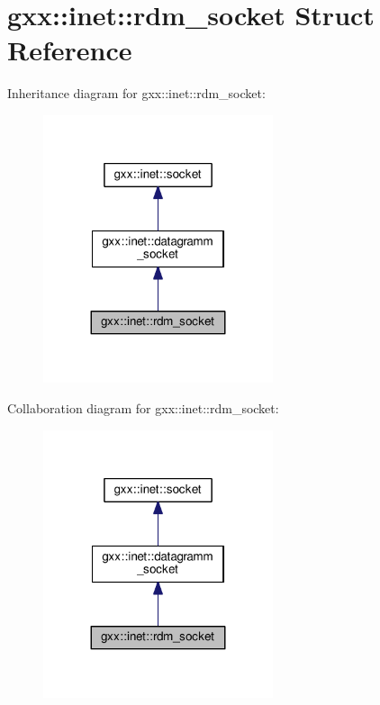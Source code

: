 \hypertarget{structgxx_1_1inet_1_1rdm__socket}{}\section{gxx\+:\+:inet\+:\+:rdm\+\_\+socket Struct Reference}
\label{structgxx_1_1inet_1_1rdm__socket}


Inheritance diagram for gxx\+:\+:inet\+:\+:rdm\+\_\+socket\+:
\nopagebreak
\begin{figure}[H]
\begin{center}
\leavevmode
\includegraphics[width=191pt]{structgxx_1_1inet_1_1rdm__socket__inherit__graph}
\end{center}
\end{figure}


Collaboration diagram for gxx\+:\+:inet\+:\+:rdm\+\_\+socket\+:
\nopagebreak
\begin{figure}[H]
\begin{center}
\leavevmode
\includegraphics[width=191pt]{structgxx_1_1inet_1_1rdm__socket__coll__graph}
\end{center}
\end{figure}

